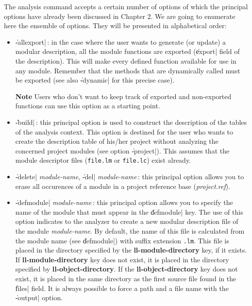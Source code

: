 The analysis command accepts a certain number of options of which the principal options have already been discussed in Chapter 2.  We are going to enumerate here the ensemble of options.  They will be presented in alphabetical order: 

\begin{itemize}

\item {\Large \|-allexport|}\,: in the case where the user wants to generate (or update) a modular description, all the module functions are exported (\|export| field of the description).  
This will make every defined function available for use in any module.
Remember that the methods that are dynamically called must be exported (see also \|-dynamic| for this precise case).
\begin{Side} {\bf Note}
Users who don't want to keep track of exported and non-exported functions can use this option as a starting point.
\end{Side}

\item {\Large \|-build|}\,: this principal option is used
to construct the description of the tables of the analysis context. This option is destined for the user
who wants to create the description table of his/her project without analyzing the 
concerned project modules (see option \|-project|).  This assumes that the module descriptor files  ({\tt file.lm} or {\tt file.lc}) exist already.

\item {\Large \|-delete| {\em module-name}, \|-del| {\em
module-name}}\,: this principal option 
allows you to erase all occurences of a module in a project reference base ({\it project.ref}).

\item {\Large \|-defmodule| {\em module-name}}\,: this principal option allows you to specify the name of the module that must appear in the \|defmodule| key.  The use of this option indicates to the analyzer to create a new modular description file of the module {\em module-name}.
By default, the name of this file is calculated from the module name (see \|defmodule|) with suffix extension {\tt .lm}.
This file is placed in the directory specified by the {\bf ll-module-directory} key, if it exists.  If {\bf ll-module-directory}
key does not exist, it is placed in the directory specified by {\bf ll-object-directory}.  If the {\bf ll-object-directory} key does not exist, it is placed in the same directory as the first source file found in the \|files| field.
It is always possible to force a path and a file name with the \|-output| option.


\end{itemize}

